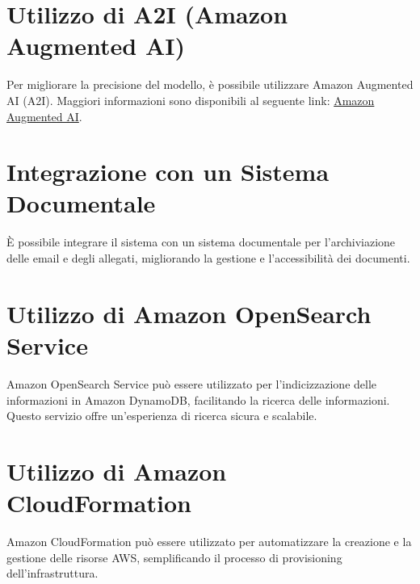 \section{Utilizzo di A2I (Amazon Augmented AI)}

Per migliorare la precisione del modello, è possibile utilizzare Amazon Augmented AI (A2I). Maggiori informazioni sono disponibili al seguente link: \href{https://aws.amazon.com/it/augmented-ai/}{Amazon Augmented AI}.

\section{Integrazione con un Sistema Documentale}

È possibile integrare il sistema con un sistema documentale per l'archiviazione delle email e degli allegati, migliorando la gestione e l'accessibilità dei documenti.

\section{Utilizzo di Amazon OpenSearch Service}

Amazon OpenSearch Service può essere utilizzato per l'indicizzazione delle informazioni in Amazon DynamoDB, facilitando la ricerca delle informazioni. Questo servizio offre un'esperienza di ricerca sicura e scalabile.

\section{Utilizzo di Amazon CloudFormation}

Amazon CloudFormation può essere utilizzato per automatizzare la creazione e la gestione delle risorse AWS, semplificando il processo di provisioning dell'infrastruttura.